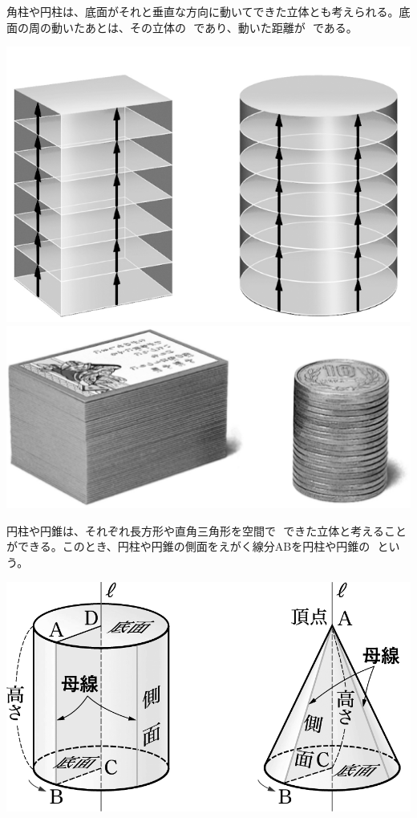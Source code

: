 \documentclass[
  12pt,a4paper,lualatex,ja=standard]{bxjsarticle}
\begin{document}
角柱や円柱は、底面がそれと垂直な方向に動いてできた立体とも考えられる。底面の周の動いたあとは、その立体の\,  \,であり、動いた距離が\,  \,である。

\begin{center}
\includegraphics{media/image88.png}
\hspace{8mm}
\includegraphics{media/image89.png}
\end{center}

円柱や円錐は、それぞれ長方形や直角三角形を空間で\,  \,できた立体と考えることができる。このとき、円柱や円錐の側面をえがく線分ABを円柱や円錐の\,  \,という。

\begin{center}
\includegraphics{media/image102.png}
\end{center}
\end{document}
